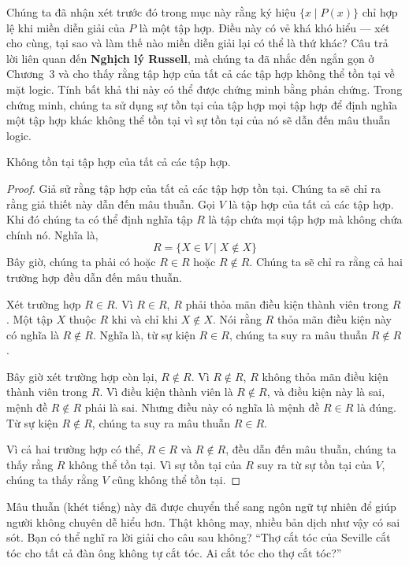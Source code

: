 Chúng ta đã nhận xét trước đó trong mục này rằng ký hiệu $\{x \mid P(x)\}$ chỉ hợp lệ khi miền diễn giải của $P$ là một tập hợp. Điều này có vẻ khá khó hiểu --- xét cho cùng, tại sao và làm thế nào miền diễn giải lại có thể là thứ khác? Câu trả lời liên quan đến \textbf{Nghịch lý Russell}, mà chúng ta đã nhắc đến ngắn gọn ở Chương~3 và cho thấy rằng tập hợp của tất cả các tập hợp không thể tồn tại về mặt logic. Tính bất khả thi này có thể được chứng minh bằng phản chứng. Trong chứng minh, chúng ta sử dụng sự tồn tại của tập hợp mọi tập hợp để định nghĩa một tập hợp khác không thể tồn tại vì sự tồn tại của nó sẽ dẫn đến mâu thuẫn logic.

\begin{theorem}
\label{thm:4.2}
Không tồn tại tập hợp của tất cả các tập hợp.
\end{theorem}

\begin{proof}
Giả sử rằng tập hợp của tất cả các tập hợp tồn tại. Chúng ta sẽ chỉ ra rằng giả thiết này dẫn đến mâu thuẫn. Gọi $V$ là tập hợp của tất cả các tập hợp. Khi đó chúng ta có thể định nghĩa tập $R$ là tập chứa mọi tập hợp mà không chứa chính nó. Nghĩa là,
\[
R = \{X \in V \mid X \notin X\}
\]
Bây giờ, chúng ta phải có hoặc $R \in R$ hoặc $R \notin R$. Chúng ta sẽ chỉ ra rằng cả hai trường hợp đều dẫn đến mâu thuẫn.

Xét trường hợp $R \in R$. Vì $R \in R$, $R$ phải thỏa mãn điều kiện thành viên trong $R$. Một tập $X$ thuộc $R$ khi và chỉ khi $X \notin X$. Nói rằng $R$ thỏa mãn điều kiện này có nghĩa là $R \notin R$. Nghĩa là, từ sự kiện $R \in R$, chúng ta suy ra mâu thuẫn $R \notin R$.

Bây giờ xét trường hợp còn lại, $R \notin R$. Vì $R \notin R$, $R$ không thỏa mãn điều kiện thành viên trong $R$. Vì điều kiện thành viên là $R \notin R$, và điều kiện này là sai, mệnh đề $R \notin R$ phải là sai. Nhưng điều này có nghĩa là mệnh đề $R \in R$ là đúng. Từ sự kiện $R \notin R$, chúng ta suy ra mâu thuẫn $R \in R$.

Vì cả hai trường hợp có thể, $R \in R$ và $R \notin R$, đều dẫn đến mâu thuẫn, chúng ta thấy rằng $R$ không thể tồn tại. Vì sự tồn tại của $R$ suy ra từ sự tồn tại của $V$, chúng ta thấy rằng $V$ cũng không thể tồn tại.
\end{proof}

\begin{notebox}
Mâu thuẫn (khét tiếng) này đã được chuyển thể sang ngôn ngữ tự nhiên để giúp người không chuyên dễ hiểu hơn. Thật không may, nhiều bản dịch như vậy có sai sót. Bạn có thể nghĩ ra lời giải cho câu sau không? ``Thợ cắt tóc của Seville cắt tóc cho tất cả đàn ông không tự cắt tóc. Ai cắt tóc cho thợ cắt tóc?''
\end{notebox}

